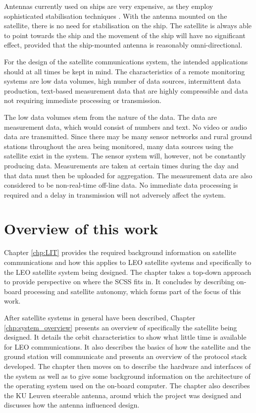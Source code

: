 Antennas currently used on ships are very expensive, as they employ sophisticated stabilisation techniques
\cite{stable_antenna}. With the antenna mounted on the satellite, there is no need for stabilisation on
the ship. The satellite is always able to point towards the ship and the movement of the ship will have no
significant effect, provided that the ship-mounted antenna is reasonably omni-directional.

For the design of the satellite communications system, the intended applications should at all times be kept
in mind. The characteristics of a remote monitoring systems are low data volumes, high number of
data sources, intermittent data production, text-based measurement data that are highly compressible
and data not requiring immediate processing or transmission.

The low data volumes stem from the nature of the data. The data are measurement data, which would
consist of numbers and text. No video or audio data are transmitted. Since there may be many sensor networks
and rural ground stations throughout the area being monitored, many data sources using the satellite exist in
the system. The sensor system will, however, not be constantly producing data. Measurements are
taken at certain times during the day and that data must then be uploaded for aggregation. The measurement
data are also considered to be non-real-time off-line data. No immediate data processing is required
and a delay in transmission will not adversely affect the system.

\section{Overview of this work}
\label{overview_intro}

Chapter \ref{chp:LIT} provides the required background information on satellite communications and how
this applies to LEO satellite systems and specifically to the LEO satellite system being designed.
The chapter takes a top-down approach to provide perspective on where the SCSS fits in.
It concludes by describing on-board processing and satellite autonomy, which forms part of the
focus of this work.

After satellite systems in general have been described, Chapter \ref{chp:system_overview} presents an
overview of specifically the satellite being designed. It details the orbit characteristics to show what
little time is available for LEO communications. It also describes the basics of how the satellite and
the ground station will communicate and presents an overview of the protocol stack developed. The
chapter then moves on to describe the hardware and interfaces of the system as well as to give
some background information on the architecture of the operating system used on the on-board computer.
The chapter also describes the KU Leuven steerable antenna, around which the project was designed and
discusses how the antenna influenced design.

